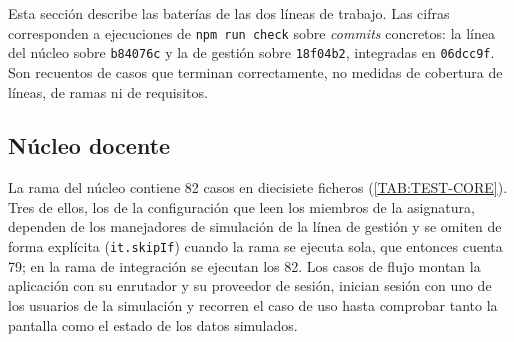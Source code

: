 Esta sección describe las baterías de las dos líneas de trabajo. Las cifras corresponden a
ejecuciones de \texttt{npm run check} sobre \textit{commits} concretos: la línea del núcleo
sobre \texttt{b84076c} y la de gestión sobre \texttt{18f04b2}, integradas en
\texttt{06dcc9f}. Son recuentos de casos que
terminan correctamente, no medidas de cobertura de líneas, de ramas ni de requisitos.

\subsection{Núcleo docente}

La rama del núcleo contiene 82 casos en diecisiete ficheros (\cref{TAB:TEST-CORE}). Tres de
ellos, los de la configuración que leen los miembros de la asignatura, dependen de los
manejadores de simulación de la línea de gestión y se omiten de forma explícita
(\texttt{it.skipIf}) cuando la rama se ejecuta sola, que entonces cuenta 79; en la rama de
integración se ejecutan los 82. Los casos de
flujo montan la aplicación con su enrutador y su proveedor de sesión, inician sesión con uno
de los usuarios de la simulación y recorren el caso de uso hasta comprobar tanto la pantalla
como el estado de los datos simulados.


